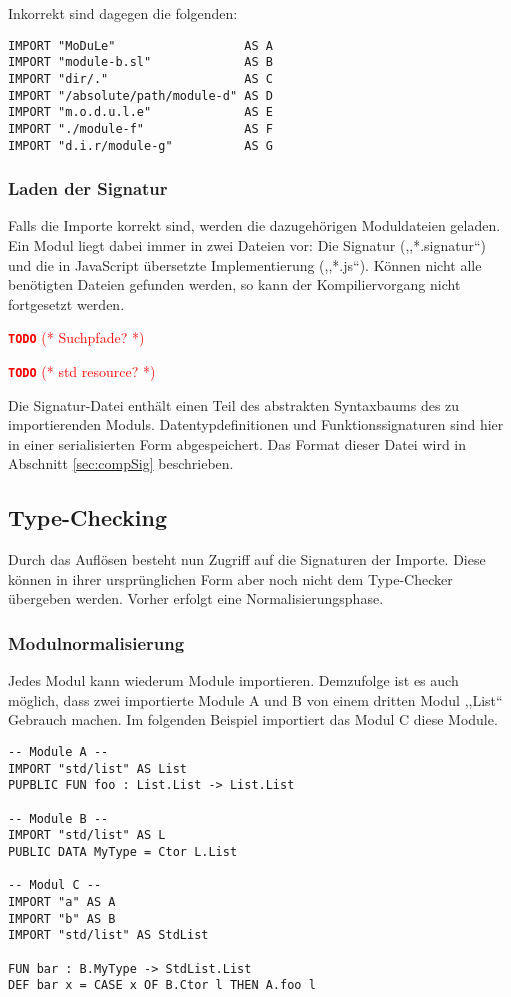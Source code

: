 \documentclass[runningheads]{llncs}
\newcommand{\TODO}[1]{ \textcolor{red}{\textbf{\texttt{\large{TODO}}} (* #1 *)}\par}
\begin{document}
Inkorrekt sind dagegen die folgenden:

\begin{verbatim}
IMPORT "MoDuLe"                  AS A
IMPORT "module-b.sl"             AS B
IMPORT "dir/."                   AS C
IMPORT "/absolute/path/module-d" AS D
IMPORT "m.o.d.u.l.e"             AS E
IMPORT "./module-f"              AS F
IMPORT "d.i.r/module-g"          AS G
\end{verbatim}

\subsubsection{Laden der Signatur}

Falls die Importe korrekt sind, werden die dazugehörigen Moduldateien geladen. Ein Modul liegt dabei immer in zwei Dateien vor: Die Signatur (,,*.signatur``) und die in JavaScript übersetzte Implementierung  (,,*.js``). Können nicht alle benötigten Dateien gefunden werden, so kann der Kompiliervorgang nicht fortgesetzt werden.

\TODO{Suchpfade?}
\TODO{std resource?}

Die Signatur-Datei enthält einen Teil des abstrakten Syntaxbaums des zu importierenden Moduls. Datentypdefinitionen und Funktionssignaturen sind hier in einer serialisierten Form abgespeichert. Das Format dieser Datei wird in Abschnitt \ref{sec:compSig} beschrieben.

\subsection{Type-Checking}

Durch das Auflösen besteht nun Zugriff auf die Signaturen der Importe. Diese können in ihrer ursprünglichen Form aber noch nicht dem Type-Checker übergeben werden. Vorher erfolgt eine Normalisierungsphase.

\subsubsection{Modulnormalisierung}

Jedes Modul kann wiederum Module importieren. Demzufolge ist es auch möglich, dass zwei importierte Module A und B von einem dritten Modul ,,List`` Gebrauch machen. Im folgenden Beispiel importiert das Modul C diese Module.


\begin{verbatim}
-- Module A --
IMPORT "std/list" AS List
PUPBLIC FUN foo : List.List -> List.List

-- Module B --
IMPORT "std/list" AS L
PUBLIC DATA MyType = Ctor L.List

-- Modul C --
IMPORT "a" AS A
IMPORT "b" AS B
IMPORT "std/list" AS StdList

FUN bar : B.MyType -> StdList.List
DEF bar x = CASE x OF B.Ctor l THEN A.foo l
\end{verbatim}
\end{document}
